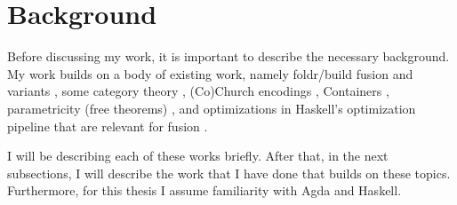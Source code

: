 
\section{Background}
Before discussing my work, it is important to describe the necessary background.
My work builds on a body of existing work, namely foldr/build fusion and variants \citep{Gill1993,Svenningsson2002,Coutts2007}, some category theory \citep{Ahrens2022}, (Co)Church encodings \citep{Harper2011}, Containers \citep{Abbott2005}, parametricity (free theorems) \citep{Wadler1989}, and optimizations in Haskell's optimization pipeline that are relevant for fusion \citep{Jones1996}.

I will be describing each of these works briefly.
After that, in the next subsections, I will describe the work that I have done that builds on these topics.
Furthermore, for this thesis I assume familiarity with Agda and Haskell.





